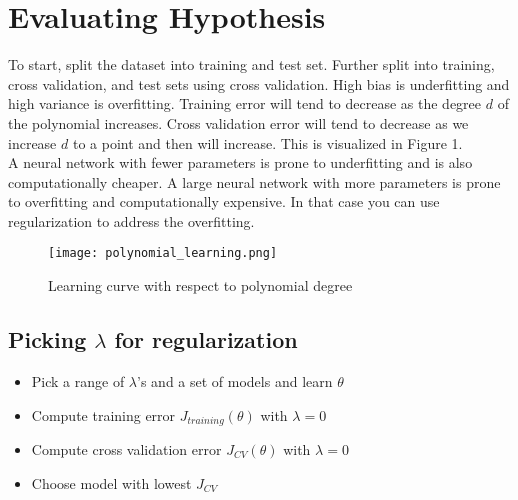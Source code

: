 \documentclass[12pt]{article}
\begin{document}
\section{Evaluating Hypothesis}
To start, split the dataset into training and test set. Further split into training, cross validation, and test sets using cross validation. High bias is underfitting and high variance is overfitting. Training error will tend to decrease as the degree $d$ of the polynomial increases. Cross validation error will tend to decrease as we increase $d$ to a point and then will increase. This is visualized in Figure 1.\\ 

A neural network with fewer parameters is prone to underfitting and is also computationally cheaper. A large neural network with more parameters is prone to overfitting and computationally expensive. In that case you can use regularization to address the overfitting. 

\begin{figure}
\centering
\texttt{[image: polynomial\_learning.png]}
\caption{Learning curve with respect to polynomial degree}
\label{fig:polynomiallearning}
\end{figure}
\subsection{Picking $\lambda$ for regularization}
\begin{itemize}
	\item Pick a range of $\lambda$'s and a set of models and learn $\theta$
	\item Compute training error $J_{training}(\theta)$ with $\lambda=0$
	\item Compute cross validation error $J_{CV}(\theta)$ with $\lambda=0$
	\item Choose model with lowest $J_{CV}$
\end{itemize}
\end{document}

